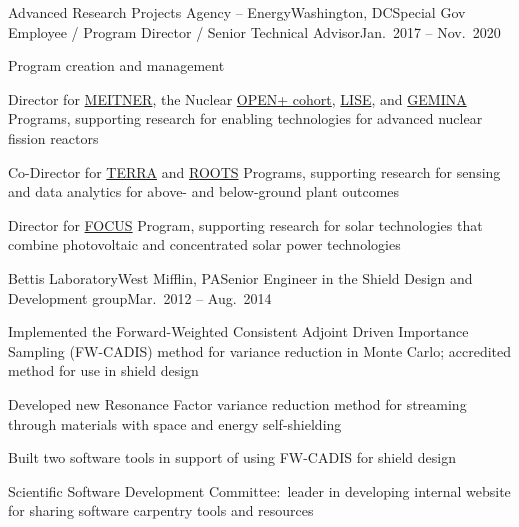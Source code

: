 \begin{rSubsection}{Advanced Research Projects Agency -- Energy}{Washington,
DC}{Special Gov Employee / Program Director / Senior Technical Advisor}{Jan.\
2017 -- Nov.\ 2020}
\item Program creation and management
\item Director for
\href{https://arpa-e.energy.gov/?q=arpa-e-programs/meitner}{MEITNER}, the
Nuclear
\href{https://arpa-e.energy.gov/?q=news-item/arpa-e-announces-12-million-five-projects-nuclear-materials-science}{OPEN+
cohort},
\href{https://arpa-e.energy.gov/?q=news-item/arpa-e-innovating-through-unconventional-ideas}{LISE}, and  \href{https://arpa-e.energy.gov/technologies/programs/gemina}{GEMINA} Programs, supporting research for enabling technologies for advanced nuclear fission reactors
\item Co-Director for \href{https://arpa-e.energy.gov/?q=arpa-e-programs/terra}{TERRA} and \href{https://arpa-e.energy.gov/?q=arpa-e-programs/roots}{ROOTS} Programs, supporting research for sensing and data analytics for above- and below-ground plant outcomes
\item Director for \href{https://arpa-e.energy.gov/?q=arpa-e-programs/focus}{FOCUS} Program, supporting research for solar technologies that combine photovoltaic and concentrated solar power technologies
\end{rSubsection}



\begin{rSubsection}{Bettis Laboratory}{West Mifflin, PA}{Senior Engineer in the Shield Design and Development group}{Mar.\ 2012 -- Aug.\ 2014}
\item Implemented the Forward-Weighted Consistent Adjoint Driven Importance Sampling (FW-CADIS) method for variance reduction in Monte Carlo; accredited method for use in shield design
\item Developed new Resonance Factor variance reduction method for streaming through materials with space and energy self-shielding
\item Built two software tools in support of using FW-CADIS for shield design
\item Scientific Software Development Committee:\ leader in developing internal website for sharing software carpentry tools and resources
\end{rSubsection}


